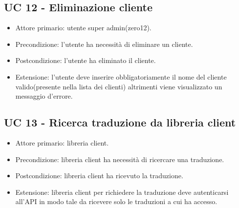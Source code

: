 \subsection{UC 12 - Eliminazione cliente}
    \begin{itemize}
        \item Attore primario: utente super admin(zero12).
        \item Precondizione: l'utente ha necessità di eliminare un cliente.
        \item Postcondizione: l'utente ha eliminato il cliente.
        \item Estensione: l'utente deve inserire obbligatoriamente il nome del cliente valido(presente nella lista dei clienti) altrimenti viene visualizzato un messaggio d'errore.
    \end{itemize}
\subsection{UC 13 - Ricerca traduzione da libreria client}
    \begin{itemize}
        \item Attore primario: libreria client.
        \item Precondizione: libreria client ha necessità di ricercare una traduzione.
        \item Postcondizione: libreria client ha ricevuto la traduzione.
        \item Estensione: libreria client per richiedere la traduzione deve autenticarsi all'API in modo tale da ricevere solo le traduzioni a cui ha accesso.
    \end{itemize}

